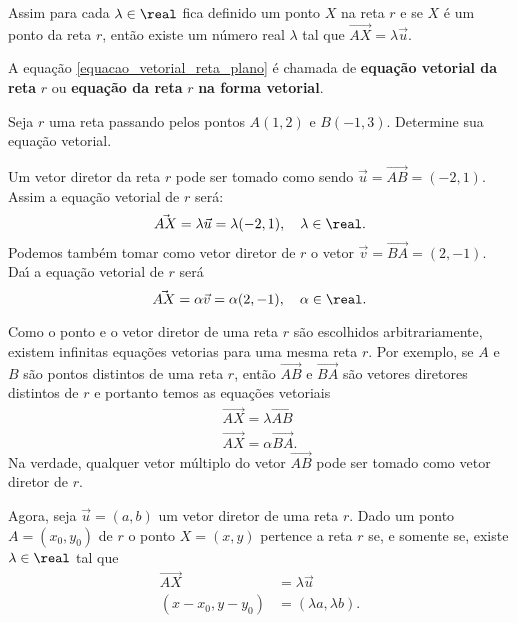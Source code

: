 Assim para cada $\lambda \in \real$ fica definido um ponto $X$ na reta $r$ e se $X$ \'e um ponto da reta $r$, ent\~ao existe um n\'umero real $\lambda$ tal que $\vec{AX} = \lambda\vec{u}$.

\begin{definicao}
  A equa\c{c}\~ao \eqref{equacao_vetorial_reta_plano} \'e chamada de \textbf{equa\c{c}\~ao vetorial da reta} $r$ ou \textbf{equa\c{c}\~ao da reta} $r$ \textbf{na forma vetorial}.
\end{definicao}

\begin{exemplos}
  Seja $r$ uma reta passando pelos pontos $A(1,2)$ e $B(-1, 3)$. Determine sua equa\c{c}\~ao vetorial.
  \begin{solucao}
    Um vetor diretor da reta $r$ pode ser tomado como sendo $\vec{u} = \vec{AB} = (-2, 1)$. Assim a equa\c{c}\~ao vetorial de $r$ ser\'a:
    \[
      \vec{AX} = \lambda\vec{u} = \lambda(-2,1), \quad \lambda \in \real.
    \]
    Podemos tamb\'em tomar como vetor diretor de $r$ o vetor $\vec{v} = \vec{BA} = (2,-1)$. Da{\'\i} a equa\c{c}\~ao vetorial de $r$ ser\'a
    \[
      \vec{AX} = \alpha\vec{v} = \alpha(2, -1), \quad \alpha \in \real.
    \]
  \end{solucao}
\end{exemplos}

\begin{observacao}
  Como o ponto e o vetor diretor de uma reta $r$ s\~ao escolhidos arbitrariamente, existem infinitas equa\c{c}\~oes vetorias para uma mesma reta $r$. Por exemplo, se $A$ e $B$ s\~ao pontos distintos de uma reta $r$, ent\~ao $\vec{AB}$ e $\vec{BA}$ s\~ao vetores diretores distintos de $r$ e portanto temos as equa\c{c}\~oes vetoriais
  \begin{align*}
    \vec{AX} = \lambda\vec{AB}\\
    \vec{AX} = \alpha\vec{BA}.
  \end{align*}
  Na verdade, qualquer vetor m\'ultiplo do vetor $\vec{AB}$ pode ser tomado como vetor diretor de $r$.
\end{observacao}

Agora, seja $\vec{u} = (a, b)$ um vetor diretor de uma reta $r$. Dado um ponto $A = (x_0, y_0)$ de $r$ o ponto $X = (x, y)$ pertence a reta $r$ se, e somente se, existe $\lambda \in \real$ tal que
\begin{align*}
  \vec{AX} &= \lambda\vec{u}\\
  (x - x_0, y - y_0) &= (\lambda a, \lambda b).
\end{align*}

